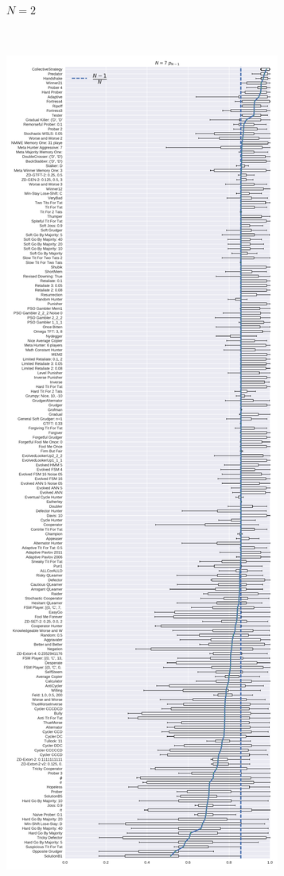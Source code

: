 \documentclass{article}
\begin{document}
\begin{figure}[!hbtp]
\begin{subfigure}[t]{.3\textwidth}
        \caption{\(N=2\)}
    \end{subfigure}%
    ~
    \begin{subfigure}[t]{.3\textwidth}
        \centering
        \includegraphics[width=\textwidth]{../img/boxplot_7_resist.pdf}

\end{subfigure}
\end{figure}
\end{document}
